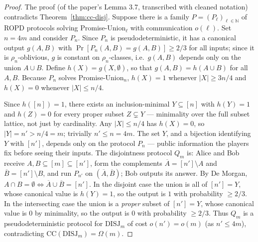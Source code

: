 \begin{proof}
The proof (of the paper's Lemma 3.7, transcribed with cleaned notation)
contradicts Theorem~\ref{thm:cc-disj}. Suppose there is a family
$P = (P_\ell)_{\ell \in \mathbb{N}}$ of ROPD protocols solving
Promise-Union$_\ell$ with communication $o(\ell)$. Set $n = 4m$ and consider
$P_n$. Since $P_n$ is pseudodeterministic, it has a canonical output $g(A,B)$ with
$\Pr[P_n(A,B) = g(A,B)] \ge 2/3$ for all inputs; since it is $\rho_n$-oblivious,
$g$ is constant on $\rho_n$-classes, i.e.\ $g(A,B)$ depends only on the union
$A \cup B$. Define $h(X) = g(X, \emptyset)$, so that $g(A,B) = h(A \cup B)$ for
all $A, B$. Because $P_n$ solves Promise-Union$_n$, $h(X) = 1$ whenever
$|X| \ge 3n/4$ and $h(X) = 0$ whenever $|X| \le n/4$.

Since $h([n]) = 1$, there exists an inclusion-minimal $Y \subseteq [n]$ with
$h(Y) = 1$ and $h(Z) = 0$ for every proper subset $Z \subsetneq Y$ --- minimality
over the full subset lattice, not just by cardinality. Any $|X| \le n/4$ has
$h(X) = 0$, so $|Y| = n' > n/4 = m$; trivially $n' \le n = 4m$. The set $Y$, and a
bijection identifying $Y$ with $[n']$, depends only on the protocol $P_n$ ---
public information the players fix before seeing their inputs. The disjointness
protocol $Q_m$ is: Alice and Bob receive $A, B \subseteq [m] \subseteq [n']$, form
the complements $\overline{A} = [n'] \setminus A$ and
$\overline{B} = [n'] \setminus B$, and run $P_{n'}$ on
$(\overline{A}, \overline{B})$; Bob outputs its answer. By De Morgan,
$A \cap B = \emptyset \iff \overline{A} \cup \overline{B} = [n']$. In the disjoint
case the union is all of $[n'] = Y$, whose canonical value is $h(Y) = 1$, so the
output is $1$ with probability $\ge 2/3$. In the intersecting case the union is a
\emph{proper} subset of $[n'] = Y$, whose canonical value is $0$ by minimality, so
the output is $0$ with probability $\ge 2/3$. Thus $Q_m$ is a pseudodeterministic
protocol for $\mathrm{DISJ}_m$ of cost $o(n') = o(m)$ (as $n' \le 4m$),
contradicting $\mathrm{CC}(\mathrm{DISJ}_m) = \Omega(m)$.
\end{proof}



